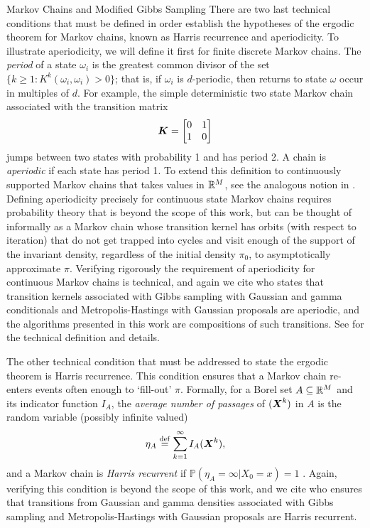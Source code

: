 \begin{chapter}{Markov Chains and Modified Gibbs Sampling}
There are two last technical conditions that must be defined in order establish the hypotheses of the ergodic theorem for Markov chains, known as Harris recurrence and aperiodicity.
To illustrate aperiodicity, we will define it first for finite discrete Markov chains.
The \emph{period} of a state $\omega_i$ is the greatest common divisor of the set $\{k\ge 1: K^k(\omega_i,\omega_i) > 0\}$; that is, if $\omega_i$ is $d$-periodic, then returns to state $\omega$ occur in multiples of $d$.
For example, the simple deterministic two state Markov chain associated with the transition matrix
\begin{equation}
  \mbox{\boldmath$K$} = \begin{bmatrix}
    0 & 1\\
    1 & 0
  \end{bmatrix}
\end{equation}
jumps between two states with probability 1 and has period 2.
A chain is \emph{aperiodic} if each state has period 1. 
To extend this definition to continuously supported Markov chains that takes values in $\mathbb R^M$, see the analogous notion in \citep[Chapter 6.3]{robert2013monte}.
Defining aperiodicity precisely for continuous state Markov chains requires probability theory that is beyond the scope of this work, but can be thought of informally as a Markov chain whose transition kernel has orbits (with respect to iteration) that do not get trapped into cycles and visit enough of the support of the invariant density, regardless of the initial density $\pi_0$, to asymptotically approximate $\pi$. 
Verifying rigorously the requirement of aperiodicity for continuous Markov chains is technical, and again we cite \citep{liu2008monte} who states that transition kernels associated with Gibbs sampling with Gaussian and gamma conditionals and Metropolis-Hastings with Gaussian proposals are aperiodic, and the algorithms presented in this work are compositions of such transitions.
See \citep{robert2013monte} for the technical definition and details.

The other technical condition that must be addressed to state the ergodic theorem is Harris recurrence. 
This condition ensures that a Markov chain re-enters events often enough to `fill-out' $\pi$. 
Formally, for a Borel set $A\subseteq \mathbb R^M$ and its indicator function $I_A$, the \emph{average number of passages} of $(\mbox{\boldmath$X$}^k)$ in $A$ is the random variable (possibly infinite valued)
\begin{equation}
  \eta_A\stackrel{\rm def}{=} \sum_{k=1}^\infty I_A(\mbox{\boldmath$X$}^k),
\end{equation}
and a Markov chain is \emph{Harris recurrent} if $\mathbb P(\eta_A = \infty|X_0=x) =1$ \citep{robert2013monte}. 
Again, verifying this condition is beyond the scope of this work, and we cite \citep{liu2008monte} who ensures that transitions from Gaussian and gamma densities associated with Gibbs sampling and Metropolis-Hastings with Gaussian proposals are Harris recurrent.


\end{chapter}
